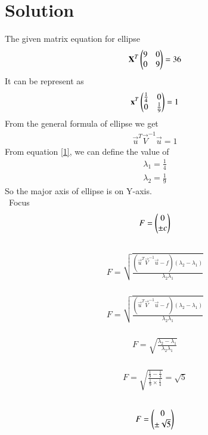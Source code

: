 \documentclass[journal,12pt,twocolumn]{IEEEtran}
\begin{document}
\section{Solution}
The given matrix equation for ellipse
\begin{align}
   \mathbf{X}^T\begin{pmatrix}9&0\\0&9\end{pmatrix}=36
\end{align} 
It can be represent as
   \begin{align}
    \mathbf{x}^T\begin{pmatrix}\frac{1}{4}&0\\0&\frac{1}{9}\end{pmatrix}=1\label{1}
   \end{align}
   From the general formula of ellipse we get 
   \begin{align}
     \vec{u}^T\vec{V}^{-1}\vec{u}=1  
   \end{align}
   From equation \ref{1}, we can define the value of
   \begin{align}
        \lambda_1= \frac{1}{4} \\
        \lambda_2=\frac{1}{9}
   \end{align}
   So the major axis of ellipse is on Y-axis.\\\
   Focus 
   \begin{align}
       F= \begin{pmatrix}0\\ \pm c\end{pmatrix}
       \end{align}\\
       \begin{align}
           F= \sqrt{\frac{(\vec{u}^T\vec{V}^{-1}\vec{u}-f)(\lambda_2-\lambda_1)}{\lambda_2\lambda_1}}
       \end{align}\\
       \begin{align}
           F= \sqrt{\frac{(\vec{u}^T\vec{V}^{-1}\vec{u}-f)(\lambda_2-\lambda_1)}{\lambda_2\lambda_1}}
       \end{align}
       \\
       \begin{align}
            F=\sqrt{\frac{\lambda_2-\lambda_1}{\lambda_2\lambda_1}}
       \end{align}
      \\
      \begin{align}
          F=\sqrt{\frac{\frac{1}{9}-\frac{1}{4}}{\frac{1}{9}\times\frac{1}{4}}}=\sqrt{5}
      \end{align}
       \\
       \begin{align}
           F=\begin{pmatrix}0\\\pm\sqrt{5}\end{pmatrix}
       \end{align}
    
\end{document}
